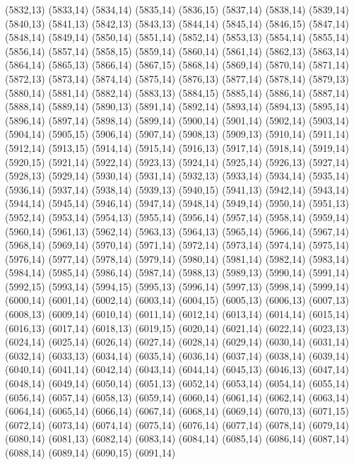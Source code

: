(5832,13)
(5833,14)
(5834,14)
(5835,14)
(5836,15)
(5837,14)
(5838,14)
(5839,14)
(5840,13)
(5841,13)
(5842,13)
(5843,13)
(5844,14)
(5845,14)
(5846,15)
(5847,14)
(5848,14)
(5849,14)
(5850,14)
(5851,14)
(5852,14)
(5853,13)
(5854,14)
(5855,14)
(5856,14)
(5857,14)
(5858,15)
(5859,14)
(5860,14)
(5861,14)
(5862,13)
(5863,14)
(5864,14)
(5865,13)
(5866,14)
(5867,15)
(5868,14)
(5869,14)
(5870,14)
(5871,14)
(5872,13)
(5873,14)
(5874,14)
(5875,14)
(5876,13)
(5877,14)
(5878,14)
(5879,13)
(5880,14)
(5881,14)
(5882,14)
(5883,13)
(5884,15)
(5885,14)
(5886,14)
(5887,14)
(5888,14)
(5889,14)
(5890,13)
(5891,14)
(5892,14)
(5893,14)
(5894,13)
(5895,14)
(5896,14)
(5897,14)
(5898,14)
(5899,14)
(5900,14)
(5901,14)
(5902,14)
(5903,14)
(5904,14)
(5905,15)
(5906,14)
(5907,14)
(5908,13)
(5909,13)
(5910,14)
(5911,14)
(5912,14)
(5913,15)
(5914,14)
(5915,14)
(5916,13)
(5917,14)
(5918,14)
(5919,14)
(5920,15)
(5921,14)
(5922,14)
(5923,13)
(5924,14)
(5925,14)
(5926,13)
(5927,14)
(5928,13)
(5929,14)
(5930,14)
(5931,14)
(5932,13)
(5933,14)
(5934,14)
(5935,14)
(5936,14)
(5937,14)
(5938,14)
(5939,13)
(5940,15)
(5941,13)
(5942,14)
(5943,14)
(5944,14)
(5945,14)
(5946,14)
(5947,14)
(5948,14)
(5949,14)
(5950,14)
(5951,13)
(5952,14)
(5953,14)
(5954,13)
(5955,14)
(5956,14)
(5957,14)
(5958,14)
(5959,14)
(5960,14)
(5961,13)
(5962,14)
(5963,13)
(5964,13)
(5965,14)
(5966,14)
(5967,14)
(5968,14)
(5969,14)
(5970,14)
(5971,14)
(5972,14)
(5973,14)
(5974,14)
(5975,14)
(5976,14)
(5977,14)
(5978,14)
(5979,14)
(5980,14)
(5981,14)
(5982,14)
(5983,14)
(5984,14)
(5985,14)
(5986,14)
(5987,14)
(5988,13)
(5989,13)
(5990,14)
(5991,14)
(5992,15)
(5993,14)
(5994,15)
(5995,13)
(5996,14)
(5997,13)
(5998,14)
(5999,14)
(6000,14)
(6001,14)
(6002,14)
(6003,14)
(6004,15)
(6005,13)
(6006,13)
(6007,13)
(6008,13)
(6009,14)
(6010,14)
(6011,14)
(6012,14)
(6013,14)
(6014,14)
(6015,14)
(6016,13)
(6017,14)
(6018,13)
(6019,15)
(6020,14)
(6021,14)
(6022,14)
(6023,13)
(6024,14)
(6025,14)
(6026,14)
(6027,14)
(6028,14)
(6029,14)
(6030,14)
(6031,14)
(6032,14)
(6033,13)
(6034,14)
(6035,14)
(6036,14)
(6037,14)
(6038,14)
(6039,14)
(6040,14)
(6041,14)
(6042,14)
(6043,14)
(6044,14)
(6045,13)
(6046,13)
(6047,14)
(6048,14)
(6049,14)
(6050,14)
(6051,13)
(6052,14)
(6053,14)
(6054,14)
(6055,14)
(6056,14)
(6057,14)
(6058,13)
(6059,14)
(6060,14)
(6061,14)
(6062,14)
(6063,14)
(6064,14)
(6065,14)
(6066,14)
(6067,14)
(6068,14)
(6069,14)
(6070,13)
(6071,15)
(6072,14)
(6073,14)
(6074,14)
(6075,14)
(6076,14)
(6077,14)
(6078,14)
(6079,14)
(6080,14)
(6081,13)
(6082,14)
(6083,14)
(6084,14)
(6085,14)
(6086,14)
(6087,14)
(6088,14)
(6089,14)
(6090,15)
(6091,14)
